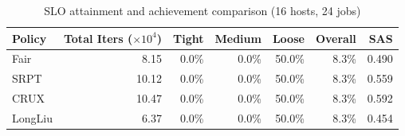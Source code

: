 \begin{table}[t]
\centering
\caption{SLO attainment and achievement comparison (16 hosts, 24 jobs)}
\label{tab:slo_16host}
\begin{tabular}{l|r|r|r|r|r|r}
\hline
Policy & Total Iters ($\times 10^4$) & Tight & Medium & Loose & Overall & SAS \\
\hline
Fair & 8.15 & 0.0\% & 0.0\% & 50.0\% & 8.3\% & 0.490 \\
SRPT & 10.12 & 0.0\% & 0.0\% & 50.0\% & 8.3\% & 0.559 \\
CRUX & 10.47 & 0.0\% & 0.0\% & 50.0\% & 8.3\% & 0.592 \\
LongLiu & 6.37 & 0.0\% & 0.0\% & 50.0\% & 8.3\% & 0.454 \\
\hline
\end{tabular}
\end{table}
